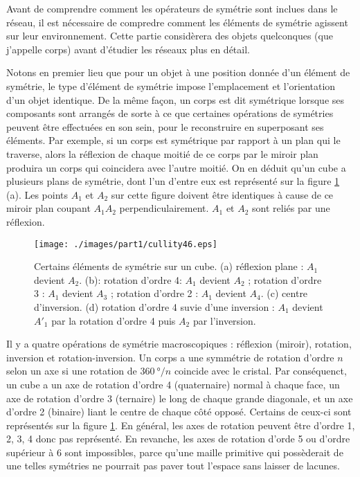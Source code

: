 Avant de comprendre comment les opérateurs de symétrie sont inclues dans le
réseau, il est nécessaire de compredre comment les éléments de symétrie
agissent sur leur environnement. Cette partie considèrera des objets quelconques (que j'appelle corps) avant d'étudier les réseaux plus en détail.

Notons en premier lieu que pour un objet à une
position donnée d'un élément de symétrie, le type d'élément de symétrie
impose l'emplacement et l'orientation d'un objet identique.
De la même façon, un corps est dit symétrique lorsque ses composants sont
arrangés de sorte à ce que certaines opérations de symétries peuvent être
effectuées en son sein, pour le reconstruire en superposant ses éléments.
Par exemple, si un corps est symétrique par rapport à un plan qui le traverse,
alors la réflexion de chaque moitié de ce corps par le miroir plan
produira un corps qui coincidera avec l'autre moitié. On en déduit qu'un cube a
plusieurs plans de symétrie, dont l'un d'entre eux est représenté sur la figure
\ref{cullity8} (a). Les points $A_1$ et $A_2$ sur cette figure doivent être
identiques à cause de ce miroir plan coupant $A_1A_2$ perpendiculairement.
$A_1$ et $A_2$ sont reliés par une réflexion.

\begin{figure}
    \texttt{[image: ./images/part1/cullity46.eps]}
    \caption{Certains éléments de symétrie sur un cube. (a) réflexion plane :
    $A_1$ devient $A_2$. (b): rotation d'ordre 4: $A_1$ devient $A_2$ ; rotation
    d'ordre 3 : $A_1$ devient $A_3$ ; rotation d'ordre 2 : $A_1$ devient $A_4$.
    (c) centre d'inversion. (d) rotation d'ordre 4 suvie d'une inversion : $A_1$
    devient $A'_1$ par la rotation d'ordre 4 puis $A_2$ par
l'inversion.}
    \label{cullity8}
\end{figure}

Il y a quatre opérations de symétrie macroscopiques : réflexion (miroir), rotation,
inversion et rotation-inversion. Un corps a une symmétrie de rotation d'ordre $n$ selon
un axe si une rotation de $\SI{360}{\degree}/n$ coincide avec le cristal. Par conséquenct, un
cube a un axe de rotation d'ordre 4 (quaternaire) normal à chaque face, un axe de rotation
d'ordre 3 (ternaire) le long de chaque grande diagonale, et un axe d'ordre 2 (binaire) liant le centre
de chaque côté opposé. Certains de ceux-ci sont représentés sur la figure
\ref{cullity8}. En général, les axes de rotation peuvent être d'ordre 1, 2, 3, 4
donc pas représenté. En revanche, les axes de rotation d'orde 5 ou d'ordre
supérieur à 6 sont impossibles, parce qu'une maille primitive qui possèderait de une
telles symétries ne pourrait pas paver tout l'espace sans laisser de lacunes.

